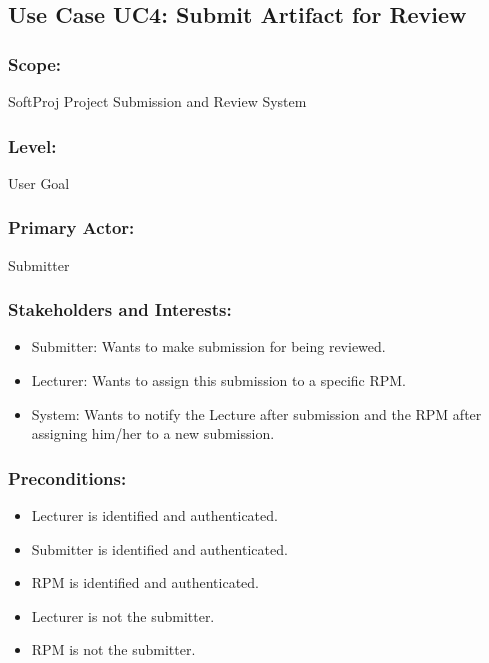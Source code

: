     
    
    
    
    
    
    
    
    
    \newpage 
    
     \subsection*{Use Case UC4: Submit Artifact for Review}
    \subsubsection*{Scope:} SoftProj Project Submission and Review System
    \subsubsection*{\textbf{Level:} }User Goal
    \subsubsection*{\textbf{Primary Actor:} } Submitter
    \subsubsection*{\textbf{Stakeholders and Interests:}}
    \begin{itemize}
    \itemsep-1em 
        \item Submitter: Wants to make submission for being reviewed.
        \item Lecturer: Wants to assign this submission to a specific RPM.
         \item System: Wants to notify the Lecture after submission and the RPM after assigning him/her to a new submission.
    \end{itemize}
    
    
    \subsubsection*{\textbf{Preconditions:}}
    \begin{itemize}
    \itemsep-1em 
        \item Lecturer is identified and authenticated.
        \item Submitter is identified and authenticated.
         \item RPM is identified and authenticated.
        \item Lecturer is not the submitter.
        \item RPM is not the submitter.
    \end{itemize}
    
